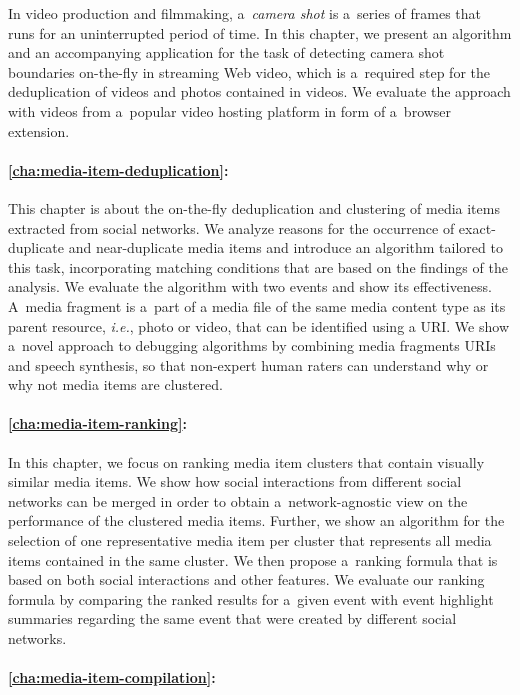 In video production and filmmaking, a~\emph{camera shot} is a~series of frames
that runs for an uninterrupted period of time.
In this chapter, we present an algorithm and an 
accompanying application for the task of detecting
camera shot boundaries on-the-fly in streaming Web video,
which is a~required step for the deduplication of videos
and photos contained in videos.
We evaluate the approach with videos from a~popular video hosting platform in form of a~browser extension.

\paragraph{\autoref{cha:media-item-deduplication}:}

This chapter is about the on-the-fly deduplication and clustering
of media items extracted from social networks.
We analyze reasons for the occurrence of exact-duplicate
and near-duplicate media items and introduce an algorithm
tailored to this task, incorporating matching conditions
that are based on the findings of the analysis.
We evaluate the algorithm with two events
and show its effectiveness.
A~media fragment is a~part of a media file
of the same media content type
as its parent resource, \emph{i.e.}, photo or video,
that can be identified using a URI.
We show a~novel approach to debugging algorithms
by combining media fragments URIs and speech synthesis,
so that non-expert human raters can understand why or why not
media items are clustered.

\paragraph{\autoref{cha:media-item-ranking}:}

In this chapter, we focus on ranking media item clusters
that contain visually similar media items.
We show how social interactions from different social networks
can be merged in order to obtain a~network-agnostic view
on the performance of the clustered media items.
Further, we show an algorithm for the selection of
one representative media item per cluster that represents
all media items contained in the same cluster.
We then propose a~ranking formula that is based on both
social interactions and other features.
We evaluate our ranking formula by comparing the ranked results
for a~given event with event highlight summaries regarding the same event
that were created by different social networks.

\paragraph{\autoref{cha:media-item-compilation}:}


